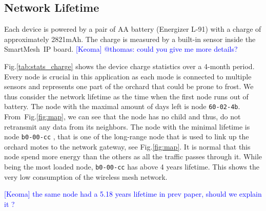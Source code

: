 \documentclass{sig-alternate}
\newcommand{\keoma}[1]       {\textcolor{blue}{[Keoma] #1}}
\newcommand{\smip}           {SmartMesh~IP\xspace}
\begin{document}
\subsection{Network Lifetime}
\label{sec:charge}


Each device is powered by a pair of AA battery (Energizer L-91) with a charge of approximately 2821mAh.
The charge is measured by a built-in sensor inside the \smip board. \keoma{@thomas: could you give me more details?}


Fig.\ref{tab:stats_charge} shows the device charge statistics over a 4-month period.
Every node is crucial in this application as each mode is connected to multiple sensors and represents one part of the orchard that could be prone to frost.
We thus consider the network lifetime as the time when the first node runs out of battery.
The node with the maximal amount of days left is node {\tt 60-02-4b}.
From~Fig.\ref{fig:map}, we can see that the node has no child and thus, do not retransmit any data from its neighbors.
The node with the minimal lifetime is node {\tt b0-00-cc} , that is one of the long-range node that is used to link up the orchard motes to the network gateway, see Fig.\ref{fig:map}.
It is normal that this node spend more energy than the others as all the traffic passes through it.
While being the most loaded node, {\tt b0-00-cc} has above 4 years lifetime.
This shows the very low consumption of the wireless mesh network.

\keoma{the same node had a 5.18 years lifetime in prev paper, should we explain it ?}
\end{document}
